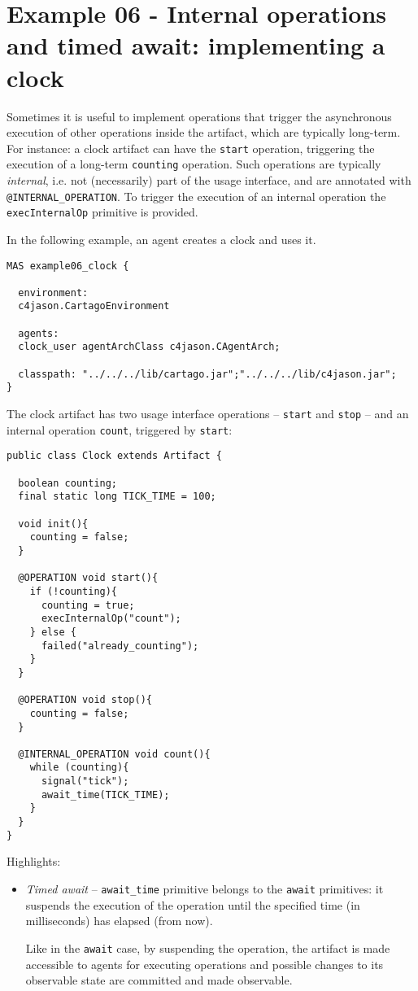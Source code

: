 \documentclass[11pt]{report}
\newcommand\code[1]{{\small{\mbox{\texttt{{#1}}}}}}
\begin{document}
\newpage
\section{Example 06 - Internal operations and timed await: implementing a clock}

Sometimes it is useful to implement operations that trigger the asynchronous execution of other operations inside the artifact, which are typically long-term.
%
For instance: a clock artifact can have the \code{start} operation, triggering the execution of a long-term \code{counting} operation.
%
Such operations are typically \emph{internal}, i.e. not (necessarily) part of the usage interface, and are annotated with \code{@INTERNAL\_OPERATION}.
%
To trigger the execution of an internal operation the \code{execInternalOp} primitive is provided.
%

\noindent In the following example, an agent creates a clock and uses it.
 
{\small{
\begin{verbatim}
MAS example06_clock {

  environment: 
  c4jason.CartagoEnvironment

  agents:  
  clock_user agentArchClass c4jason.CAgentArch;

  classpath: "../../../lib/cartago.jar";"../../../lib/c4jason.jar";    
}\end{verbatim}}}

\noindent The clock artifact has two usage interface operations -- \code{start} and \code{stop} -- and an internal operation \code{count}, triggered by \code{start}:
%
{\small{
\begin{verbatim}
public class Clock extends Artifact {

  boolean counting;
  final static long TICK_TIME = 100;
	      
  void init(){
    counting = false;
  }
	    
  @OPERATION void start(){
    if (!counting){
      counting = true;
      execInternalOp("count");
    } else {
      failed("already_counting");
    }
  }
	  
  @OPERATION void stop(){
    counting = false;
  }

  @INTERNAL_OPERATION void count(){
    while (counting){
      signal("tick");
      await_time(TICK_TIME);
    }
  }
}
\end{verbatim}}}
%

\noindent Highlights:
%
\begin{itemize}
%
\item \emph{Timed await} -- \code{await\_time} primitive belongs to the \code{await} primitives: it suspends the execution of the operation until the specified time (in milliseconds) has elapsed (from now).

Like in the \code{await} case, by suspending the operation, the artifact is made accessible to agents for executing operations and possible changes to its observable state are committed and made observable.
\end{itemize} 
\end{document}
